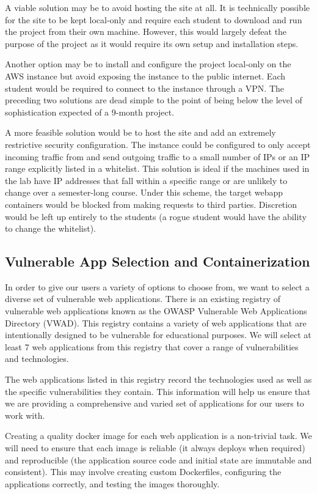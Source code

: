 \documentclass[12pt]{article}
\begin{document}
A viable solution may be to avoid hosting the site at all. It is technically possible for the site to be kept local-only and require each student to download and run the project from their own machine. However, this would largely defeat the purpose of the project as it would require its own setup and installation steps.

Another option may be to install and configure the project local-only on the AWS instance but avoid exposing the instance to the public internet. Each student would be required to connect to the instance through a VPN. The preceding two solutions are dead simple to the point of being below the level of sophistication expected of a 9-month project.

A more feasible solution would be to host the site and add an extremely restrictive security configuration. The instance could be configured to only accept incoming traffic from and send outgoing traffic to a small number of IPs or an IP range explicitly listed in a whitelist. This solution is ideal if the machines used in the lab have IP addresses that fall within a specific range or are unlikely to change over a semester-long course. Under this scheme, the target webapp containers would be blocked from making requests to third parties. Discretion would be left up entirely to the students (a rogue student would have the ability to change the whitelist).

\subsection{Vulnerable App Selection and Containerization}
In order to give our users a variety of options to choose from, we want to select a diverse set of vulnerable web applications. There is an existing registry of vulnerable web applications known as the OWASP Vulnerable Web Applications Directory (VWAD). This registry contains a variety of web applications that are intentionally designed to be vulnerable for educational purposes. We will select at least 7 web applications from this registry that cover a range of vulnerabilities and technologies.

The web applications listed in this registry record the technologies used as well as the specific vulnerabilities they contain. This information will help us ensure that we are providing a comprehensive and varied set of applications for our users to work with.

Creating a quality docker image for each web application is a non-trivial task. We will need to ensure that each image is reliable (it always deploys when required) and reproducible (the application source code and initial state are immutable and consistent). This may involve creating custom Dockerfiles, configuring the applications correctly, and testing the images thoroughly.
\end{document}
